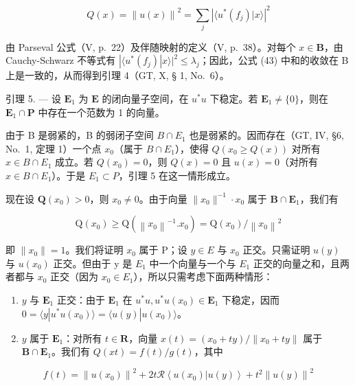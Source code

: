 \[
Q (x) = \left\| u (x) \right\| ^ {2} = \sum_ {j} \left| \langle u ^ {*} (f _ {j}) | x \rangle \right| ^ {2}\tag{43}
\]

由 Parseval 公式（V, p.~22）及伴随映射的定义（V, p.~38）。对每个 \(x \in \mathbf{B}\)，由 Cauchy-Schwarz 不等式有 \(|\langle u^{*}(f_{j})|x\rangle|^{2} \leqslant \lambda_{j}\)；因此，公式 (43) 中和的收敛在 B 上是一致的，从而得到引理 4（GT, X, § 1, No.~6）。

引理 5. --- 设 \(\mathbf{E}_1\) 为 \(\mathbf{E}\) 的闭向量子空间，在 \(u^*u\) 下稳定。若 \(\mathbf{E}_1 \neq \{0\}\)，则在 \(\mathbf{E}_1 \cap \mathbf{P}\) 中存在一个范数为 1 的向量。

由于 B 是弱紧的，B 的弱闭子空间 \(B \cap E_{1}\) 也是弱紧的。因而存在（GT, IV, §6, No.~1, 定理 1）一个点 \(x_{0}\)（属于 \(B \cap E_{1}\)），使得 \(Q(x_{0} \geqslant Q(x))\) 对所有 \(x \in B \cap E_{1}\) 成立。若 \(Q(x_{0}) = 0\)，则 \(Q(x) = 0\) 且 \(u(x) = 0\)（对所有 \(x \in B \cap E_{1}\)）。于是 \(E_{1} \subset P\)，引理 5 在这一情形成立。

现在设 \(\mathbf{Q}(x_0) > 0\)，则 \(x_0 \neq 0\)。由于向量 \(\| x_0 \|^{-1} \cdot x_0\) 属于 \(\mathbf{B} \cap \mathbf{E}_1\)，我们有

\[
\mathrm{Q} \left(x _ {0}\right) \geqslant \mathrm{Q} \left(\left\| x _ {0} \right\| ^ {- 1}. x _ {0}\right) = \mathrm{Q} \left(x _ {0}\right) / \left\| x _ {0} \right\| ^ {2}
\]

即 \(\|x_{0}\|=1\)。我们将证明 \(x_{0}\) 属于 P；设 \(y\in E\) 与 \(x_{0}\) 正交。只需证明 \(u(y)\) 与 \(u(x_{0})\) 正交。但由于 y 是 \(E_{1}\) 中一个向量与一个与 \(E_{1}\) 正交的向量之和，且两者都与 \(x_{0}\) 正交（因为 \(x_{0}\in E_{1}\)），所以只需考虑下面两种情形：

\begin{enumerate}
\def\labelenumi{\alph{enumi})}
\item
  \(y\) 与 \(\mathbf{E}_1\) 正交：由于 \(\mathbf{E}_1\) 在 \(u^* u, u^* u(x_0) \in \mathbf{E}_1\) 下稳定，因而 \(0 = \langle y | u^* u(x_0) \rangle = \langle u(y) | u(x_0) \rangle\)。
\item
  \(y\) 属于 \(\mathbf{E}_1\)：对所有 \(t \in \mathbf{R}\)，向量 \(x(t) = (x_0 + ty) / \| x_0 + ty \|\) 属于 \(\mathbf{B} \cap \mathbf{E}_1\)。我们有 \(Q(xt) = f(t) / g(t)\)，其中
\end{enumerate}

\[
f (t) = \left\| u (x _ {0}) \right\| ^ {2} + 2 t \mathscr {R} \left\langle u (x _ {0}) | u (y) \right\rangle + t ^ {2} \left\| u (y) \right\| ^ {2}
\]

